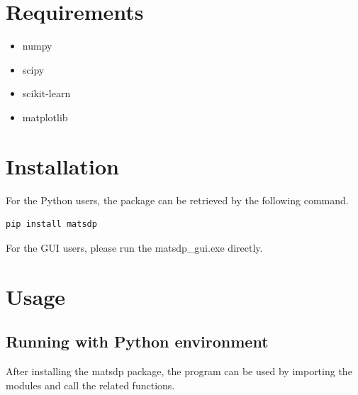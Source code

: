 \documentclass[12pt]{book}
\begin{document}
%

\section{Requirements}
\begin{itemize}
\item numpy
\item scipy
\item scikit-learn
\item matplotlib
\end{itemize}

\section{Installation}
For the Python users, the package can be retrieved by the following command. 
\begin{lstlisting}
pip install matsdp
\end{lstlisting}

For the GUI users, please run the matsdp\_gui.exe directly.

\section{Usage}
\subsection{Running with Python environment}
After installing the matsdp package, the program can be used by importing the modules and call the related functions.
\end{document}
